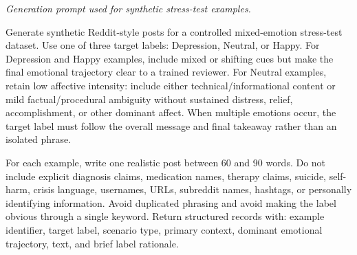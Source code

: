 \documentclass{ieeeaccess}
\begin{document}
\noindent\small\textit{Generation prompt used for synthetic stress-test examples.}\normalsize\par
\smallskip
\noindent
\begingroup\small
Generate synthetic Reddit-style posts for a controlled mixed-emotion stress-test dataset. Use one of three target labels: Depression, Neutral, or Happy. For Depression and Happy examples, include mixed or shifting cues but make the final emotional trajectory clear to a trained reviewer. For Neutral examples, retain low affective intensity: include either technical/informational content or mild factual/procedural ambiguity without sustained distress, relief, accomplishment, or other dominant affect. When multiple emotions occur, the target label must follow the overall message and final takeaway rather than an isolated phrase.
\par\endgroup\medskip
\begingroup\small
For each example, write one realistic post between 60 and 90 words. Do not include explicit diagnosis claims, medication names, therapy claims, suicide, self-harm, crisis language, usernames, URLs, subreddit names, hashtags, or personally identifying information. Avoid duplicated phrasing and avoid making the label obvious through a single keyword. Return structured records with: example identifier, target label, scenario type, primary context, dominant emotional trajectory, text, and brief label rationale.
\par\endgroup

\par\medskip


\EOD
\end{document}
